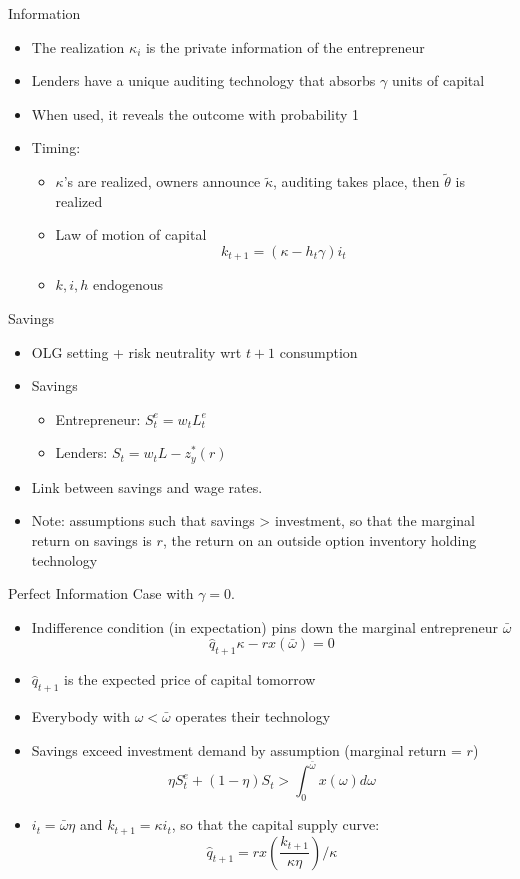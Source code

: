 \documentclass[11pt,aspectratio=169,xcolor={dvipsnames},hyperref={pdftex,pdfpagemode=UseNone,hidelinks,pdfdisplaydoctitle=true},usepdftitle=false]{beamer}
\begin{document}
\begin{frame}{Information}
\begin{itemize}
\item The realization $\kappa_i$ is the private information of the entrepreneur
\item Lenders have a unique auditing technology that absorbs $\gamma$ units of capital
\item When used, it reveals the outcome with probability 1
\item Timing:
\begin{itemize}
\item $\kappa$'s are realized, owners announce $\tilde{\kappa}$, auditing takes place, then $\tilde{\theta}$ is realized
\item Law of motion of capital
\[k_{t+1} = (\kappa - h_t \gamma) i_t\]
\item $k, i, h$ endogenous
\end{itemize}
\end{itemize}
\end{frame}

\begin{frame}{Savings}
\begin{itemize}
\item OLG setting + risk neutrality wrt $t+1$ consumption
\item Savings
\begin{itemize}
\item Entrepreneur: $S^e_t = w_t L^e_t$
\item Lenders: $S_t = w_t L - z^*_y(r)$
\end{itemize}
\item Link between savings and wage rates.
\item Note: assumptions such that savings > investment, so that the marginal return on savings is $r$, the return on an outside option inventory holding technology
\end{itemize}
\end{frame}

\begin{frame}{Perfect Information}
Case with $\gamma = 0$. 
\begin{itemize}
\item Indifference condition (in expectation) pins down the marginal entrepreneur $\bar{\omega}$
\[\hat{q}_{t+1} \kappa - r x(\bar{\omega}) = 0\]
\item $\hat{q}_{t+1}$ is the expected price of capital tomorrow
\item Everybody with $\omega < \bar{\omega}$ operates their technology 
\item Savings exceed investment demand by assumption (marginal return = $r$)
\[\eta S^e_t + (1-\eta)S_t > \int_0^{\bar{\omega}} x(\omega) d\omega\]
\item $i_t = \bar{\omega} \eta$ and $k_{t+1} = \kappa i_t$, so that the capital supply curve:
\[\hat{q}_{t+1} =  r x\left(\frac{k_{t+1}}{\kappa \eta} \right) /\kappa \]
\end{itemize}
\end{frame}
\end{document}
